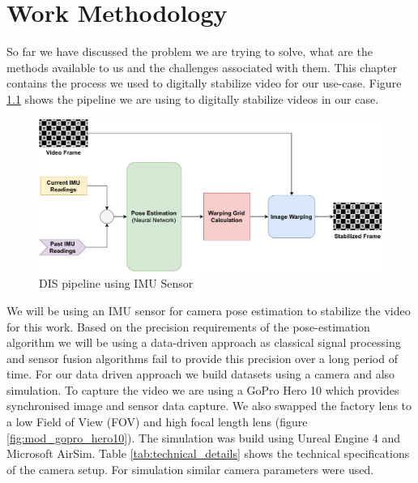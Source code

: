\chapter{Work Methodology} \label{chapter_four}

So far we have discussed the problem we are trying to solve, what are the methods available to us and the challenges associated with them. This chapter contains the process we used to digitally stabilize video for our use-case. Figure \ref{fig:dis_pipeline} shows the pipeline we are using to digitally stabilize videos in our case.


\begin{figure}[H]
    \includegraphics[scale=0.58]{images/fig_chapter4/dis_pipleline.pdf}
    \caption{DIS pipeline using IMU Sensor}
    \label{fig:dis_pipeline}
\end{figure}

We will be using an IMU sensor for camera pose estimation to stabilize the video for this work. Based on the precision requirements of the pose-estimation algorithm we will be using a data-driven approach as classical signal processing and sensor fusion algorithms fail to provide this precision over a long period of time. For our data driven approach we build datasets using a camera and also simulation. To capture the video we are using a GoPro Hero 10 which provides synchronised image and sensor data capture. We also swapped the factory lens to a low Field of View (FOV) and high focal length lens (figure \ref{fig:mod_gopro_hero10}). The simulation was build using Unreal Engine 4 and Microsoft AirSim. Table \ref{tab:technical_details} shows the technical specifications of the camera setup. For simulation similar camera parameters were used.

